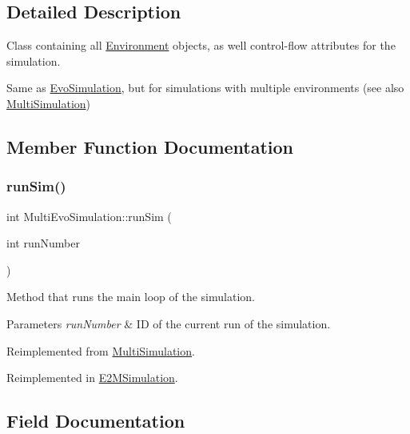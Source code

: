 \subsection{Detailed Description}
Class containing all \hyperlink{classEnvironment}{Environment} objects, as well control-\/flow attributes for the simulation. 

Same as \hyperlink{classEvoSimulation}{Evo\+Simulation}, but for simulations with multiple environments (see also \hyperlink{classMultiSimulation}{Multi\+Simulation}) 

\subsection{Member Function Documentation}
\mbox{\label{classMultiEvoSimulation_a89c9806ac998c06230cdd41cc6a532bf}} 
\subsubsection{\texorpdfstring{run\+Sim()}{runSim()}}
{\footnotesize\ttfamily int Multi\+Evo\+Simulation\+::run\+Sim (\begin{DoxyParamCaption}\item[{int}]{run\+Number }\end{DoxyParamCaption})\hspace{0.3cm}{\ttfamily [virtual]}}



Method that runs the main loop of the simulation. 


\begin{DoxyParams}{Parameters}
{\em run\+Number} & ID of the current run of the simulation. \\
\hline
\end{DoxyParams}


Reimplemented from \hyperlink{classMultiSimulation_a235347d04fd0c7e1a2e35d7a39e77583}{Multi\+Simulation}.



Reimplemented in \hyperlink{classE2MSimulation_aeac4e92c10f89a5c953ace5b1327d20b}{E2\+M\+Simulation}.



\subsection{Field Documentation}
\mbox{\label{classMultiEvoSimulation_ac9389b3f03afb6195da67337cd1f1957}} 
